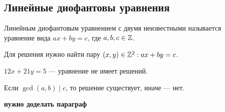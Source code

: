 \begin{normalsize}

\section{Линейные диофантовы уравнения}

\begin{defn}
    Линейным диофантовым уравнением с двумя неизвестными называется уравнение вида $ax + by = c$, где $a, b, c \in \mathbb{Z}$.
\end{defn}

Для решения нужно найти пару $(x, y) \in \mathbb{Z}^2: ax + by = c$.

\begin{example}
    $12x + 21y = 5$ --- уравнение не имеет решений.
\end{example}

Если $\gcd(a, b) \mid c$, то решение существует, иначе --- нет.

\textbf{нужно доделать параграф}

\end{normalsize}